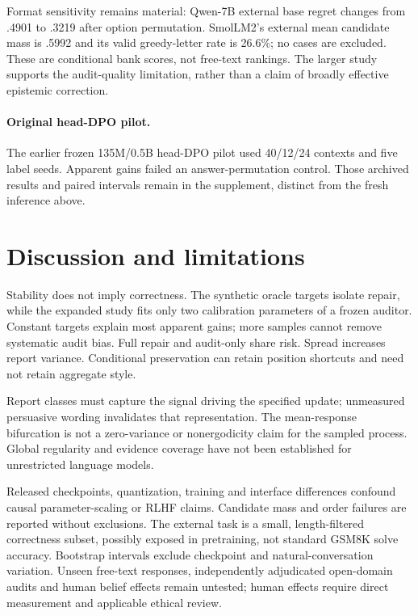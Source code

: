 \documentclass{article}
\begin{document}
Format sensitivity remains material: Qwen-7B external base regret changes
from .4901 to .3219 after option permutation. SmolLM2's external mean
candidate mass is .5992 and its valid greedy-letter rate is 26.6\%; no cases
are excluded. These are conditional bank scores, not free-text rankings.
The larger study supports the audit-quality limitation, rather than a
claim of broadly effective epistemic correction.

\paragraph{Original head-DPO pilot.}
The earlier frozen 135M/0.5B head-DPO pilot used 40/12/24 contexts and five
label seeds. Apparent gains failed an answer-permutation control. Those
archived results and paired intervals remain in the supplement, distinct
from the fresh inference above.

\section{Discussion and limitations}
Stability does not imply correctness. The synthetic oracle targets isolate
repair, while the expanded study fits only two calibration parameters of a
frozen auditor. Constant targets explain most apparent gains; more samples
cannot remove systematic audit bias. Full repair and audit-only share risk.
Spread increases report variance. Conditional preservation can retain
position shortcuts and need not retain aggregate style.

Report classes must capture the signal driving the specified update;
unmeasured persuasive wording invalidates that representation. The
mean-response bifurcation is not a zero-variance or nonergodicity claim for
the sampled process. Global regularity and evidence coverage have not been
established for unrestricted language models.

Released checkpoints, quantization, training and interface differences
confound causal parameter-scaling or RLHF claims. Candidate mass and order
failures are reported without exclusions. The external task is a small,
length-filtered correctness subset, possibly exposed in pretraining, not
standard GSM8K solve accuracy. Bootstrap intervals exclude checkpoint and
natural-conversation variation. Unseen free-text responses, independently
adjudicated open-domain audits and human belief effects remain untested;
human effects require direct measurement and applicable ethical review.
\end{document}
